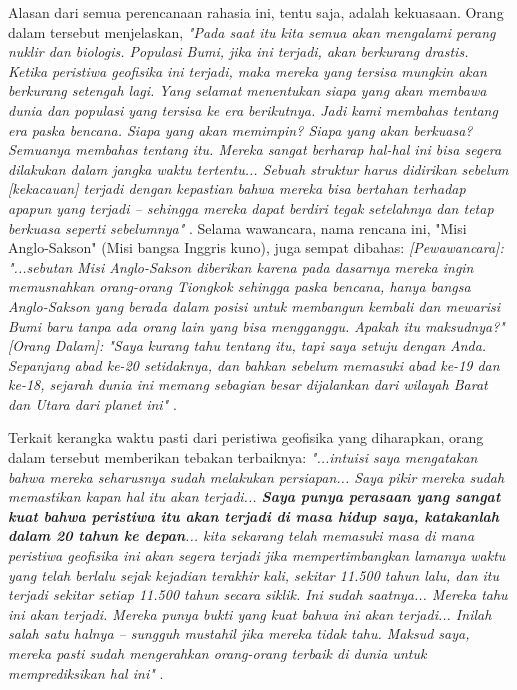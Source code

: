 \documentclass[10pt,twocolumn,letterpaper]{article}
\begin{document}
Alasan dari semua perencanaan rahasia ini, tentu saja, adalah kekuasaan. Orang dalam tersebut menjelaskan, \textit{"Pada saat itu kita semua akan mengalami perang nuklir dan biologis. Populasi Bumi, jika ini terjadi, akan berkurang drastis. Ketika peristiwa geofisika ini terjadi, maka mereka yang tersisa mungkin akan berkurang setengah lagi. Yang selamat menentukan siapa yang akan membawa dunia dan populasi yang tersisa ke era berikutnya. Jadi kami membahas tentang era paska bencana. Siapa yang akan memimpin? Siapa yang akan berkuasa? Semuanya membahas tentang itu. Mereka sangat berharap hal-hal ini bisa segera dilakukan dalam jangka waktu tertentu... Sebuah struktur harus didirikan sebelum [kekacauan] terjadi dengan kepastian bahwa mereka bisa bertahan terhadap apapun yang terjadi -- sehingga mereka dapat berdiri tegak setelahnya dan tetap berkuasa seperti sebelumnya"} \cite{4}. Selama wawancara, nama rencana ini, "Misi Anglo-Sakson" (Misi bangsa Inggris kuno), juga sempat dibahas: \textit{[Pewawancara]: "...sebutan Misi Anglo-Sakson diberikan karena pada dasarnya mereka ingin memusnahkan orang-orang Tiongkok sehingga paska bencana, hanya bangsa Anglo-Sakson yang berada dalam posisi untuk membangun kembali dan mewarisi Bumi baru tanpa ada orang lain yang bisa mengganggu. Apakah itu maksudnya?" [Orang Dalam]: "Saya kurang tahu tentang itu, tapi saya setuju dengan Anda. Sepanjang abad ke-20 setidaknya, dan bahkan sebelum memasuki abad ke-19 dan ke-18, sejarah dunia ini memang sebagian besar dijalankan dari wilayah Barat dan Utara dari planet ini"} \cite{4}.

Terkait kerangka waktu pasti dari peristiwa geofisika yang diharapkan, orang dalam tersebut memberikan tebakan terbaiknya: \textit{"...intuisi saya mengatakan bahwa mereka seharusnya sudah melakukan persiapan... Saya pikir mereka sudah memastikan kapan hal itu akan terjadi... \textbf{Saya punya perasaan yang sangat kuat bahwa peristiwa itu akan terjadi di masa hidup saya, katakanlah dalam 20 tahun ke depan}... kita sekarang telah memasuki masa di mana peristiwa geofisika ini akan segera terjadi jika mempertimbangkan lamanya waktu yang telah berlalu sejak kejadian terakhir kali, sekitar 11.500 tahun lalu, dan itu terjadi sekitar setiap 11.500 tahun secara siklik. Ini sudah saatnya... Mereka tahu ini akan terjadi. Mereka punya bukti yang kuat bahwa ini akan terjadi... Inilah salah satu halnya -- sungguh mustahil jika mereka tidak tahu. Maksud saya, mereka pasti sudah mengerahkan orang-orang terbaik di dunia untuk memprediksikan hal ini"} \cite{4}.
\end{document}
